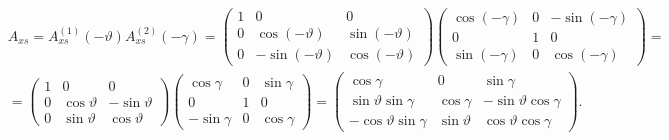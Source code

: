 \documentclass[a4paper,14pt]{article}
\theoremstyle{plain} %
\theoremstyle{definition} %
\theoremstyle{remark} %
\begin{document}
{$$$$
{\small
$$
    \begin{aligned}
         & A_{x s}=A_{x s}^{(1)}(-\vartheta) A_{x s}^{(2)}(-\gamma)=\left(\begin{array}{ccc}1 & 0 & 0 \\0 & \cos (-\vartheta) & \sin (-\vartheta) \\0 & -\sin (-\vartheta) & \cos (-\vartheta)\end{array}\right)\left(\begin{array}{ccc}\cos (-\gamma) & 0 & -\sin (-\gamma) \\0 & 1 & 0 \\\sin (-\gamma) & 0 & \cos (-\gamma)\end{array}\right)= \\
         & =\left(\begin{array}{ccc}1 & 0 & 0 \\0 & \cos \vartheta & -\sin \vartheta \\0 & \sin \vartheta & \cos \vartheta\end{array}\right)\left(\begin{array}{ccc}\cos \gamma & 0 & \sin \gamma \\0 & 1 & 0 \\-\sin \gamma & 0 & \cos \gamma\end{array}\right)=\left(\begin{array}{ccc}\cos \gamma & 0 & \sin \gamma \\\sin \vartheta \sin \gamma & \cos \gamma & -\sin \vartheta \cos \gamma \\-\cos \vartheta \sin \gamma & \sin \vartheta & \cos \vartheta \cos \gamma\end{array}\right) \text {. }
    \end{aligned}
$$
}

}
\end{document}
